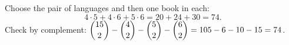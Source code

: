 Choose the pair of languages and then one book in each:
\[
4\cdot5+4\cdot6+5\cdot6=20+24+30=\boxed{74}.
\]
Check by complement: $\dbinom{15}{2}-\dbinom42-\dbinom52-\dbinom62=105-6-10-15=74$.
